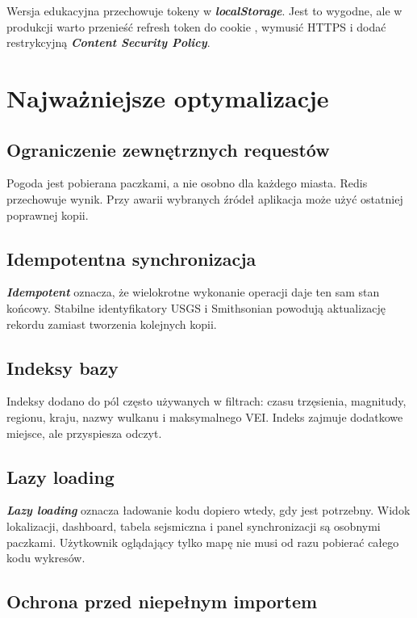 \documentclass[14pt,a5paper,oneside]{extarticle}
\newcommand{\term}[1]{\textbf{\textit{#1}}}
\newcommand{\code}[1]{\texttt{\detokenize{#1}}}
\begin{document}
Wersja edukacyjna przechowuje tokeny w \term{localStorage}. Jest to wygodne,
ale w produkcji warto przenieść refresh token do cookie \code{HttpOnly},
wymusić HTTPS i dodać restrykcyjną \term{Content Security Policy}.

\section{Najważniejsze optymalizacje}

\subsection{Ograniczenie zewnętrznych requestów}

Pogoda jest pobierana paczkami, a nie osobno dla każdego miasta. Redis
przechowuje wynik. Przy awarii wybranych źródeł aplikacja może użyć ostatniej
poprawnej kopii.

\subsection{Idempotentna synchronizacja}

\term{Idempotent} oznacza, że wielokrotne wykonanie operacji daje ten sam
stan końcowy. Stabilne identyfikatory USGS i Smithsonian powodują aktualizację
rekordu zamiast tworzenia kolejnych kopii.

\subsection{Indeksy bazy}

Indeksy dodano do pól często używanych w filtrach: czasu trzęsienia,
magnitudy, regionu, kraju, nazwy wulkanu i maksymalnego VEI. Indeks zajmuje
dodatkowe miejsce, ale przyspiesza odczyt.

\subsection{Lazy loading}

\term{Lazy loading} oznacza ładowanie kodu dopiero wtedy, gdy jest potrzebny.
Widok lokalizacji, dashboard, tabela sejsmiczna i panel synchronizacji są
osobnymi paczkami. Użytkownik oglądający tylko mapę nie musi od razu pobierać
całego kodu wykresów.

\subsection{Ochrona przed niepełnym importem}
\end{document}
